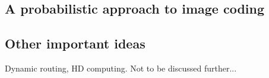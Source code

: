 \subsection{A probabilistic approach to image coding}

\subsection{Other important ideas}
Dynamic routing, HD computing. Not to be discussed further... 